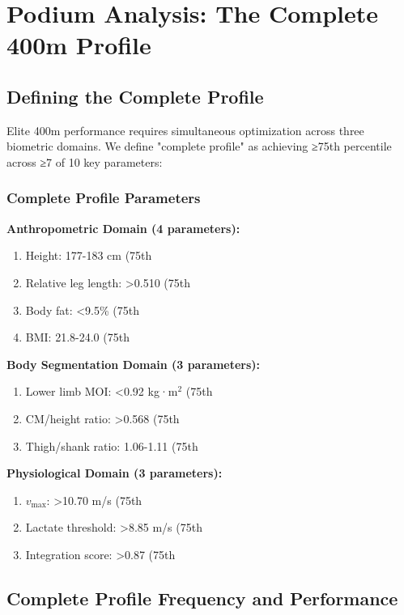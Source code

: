 \section{Podium Analysis: The Complete 400m Profile}

\subsection{Defining the Complete Profile}

Elite 400m performance requires simultaneous optimization across three biometric domains. We define "complete profile" as achieving ≥75th percentile across ≥7 of 10 key parameters:

\subsubsection{Complete Profile Parameters}

\textbf{Anthropometric Domain (4 parameters):}
\begin{enumerate}
    \item Height: 177-183 cm (75th %
    \item Relative leg length: >0.510 (75th %
    \item Body fat: <9.5\% (75th %
    \item BMI: 21.8-24.0 (75th %
\end{enumerate}

\textbf{Body Segmentation Domain (3 parameters):}
\begin{enumerate}
    \item Lower limb MOI: <0.92 kg·m$^2$ (75th %
    \item CM/height ratio: >0.568 (75th %
    \item Thigh/shank ratio: 1.06-1.11 (75th %
\end{enumerate}

\textbf{Physiological Domain (3 parameters):}
\begin{enumerate}
    \item $v_{\max}$: >10.70 m/s (75th %
    \item Lactate threshold: >8.85 m/s (75th %
    \item Integration score: >0.87 (75th %
\end{enumerate}

\subsection{Complete Profile Frequency and Performance}


